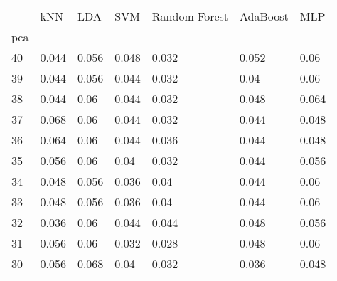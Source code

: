 \begin{tabular}{lllllll}
\toprule
{} &    kNN &    LDA &    SVM & Random Forest & AdaBoost &    MLP \\
pca &        &        &        &               &          &        \\
\midrule
40  &  0.044 &  0.056 &  0.048 &         0.032 &    0.052 &   0.06 \\
39  &  0.044 &  0.056 &  0.044 &         0.032 &     0.04 &   0.06 \\
38  &  0.044 &   0.06 &  0.044 &         0.032 &    0.048 &  0.064 \\
37  &  0.068 &   0.06 &  0.044 &         0.032 &    0.044 &  0.048 \\
36  &  0.064 &   0.06 &  0.044 &         0.036 &    0.044 &  0.048 \\
35  &  0.056 &   0.06 &   0.04 &         0.032 &    0.044 &  0.056 \\
34  &  0.048 &  0.056 &  0.036 &          0.04 &    0.044 &   0.06 \\
33  &  0.048 &  0.056 &  0.036 &          0.04 &    0.044 &   0.06 \\
32  &  0.036 &   0.06 &  0.044 &         0.044 &    0.048 &  0.056 \\
31  &  0.056 &   0.06 &  0.032 &         0.028 &    0.048 &   0.06 \\
30  &  0.056 &  0.068 &   0.04 &         0.032 &    0.036 &  0.048 \\
\bottomrule
\end{tabular}
